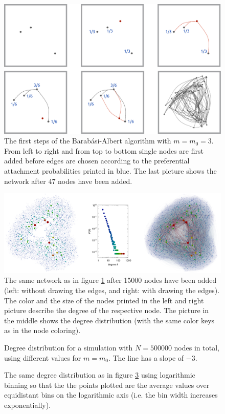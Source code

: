 \documentclass{scrartcl}
\begin{document}
\begin{figure}
    \includegraphics[width=\textwidth]{pictures/21_begin.pdf}
    \caption{The first steps of the Barab\'asi-Albert algorithm with $m
    = m_0 = 3$. From left to right and from top to bottom single nodes are
    first added before edges are chosen according to the preferential
    attachment probabilities printed in blue. The last picture shows the network
    after 47 nodes have been added.}
    \label{fig:21_begin}
\end{figure}

\begin{figure}
    \includegraphics[width=\textwidth]{pictures/21_end.pdf}
    \caption{The same network as in figure \ref{fig:21_begin} after 15000
    nodes have been added (left: without drawing the edges, and right: with
    drawing the edges). The color and the size of the nodes printed in the left
    and right picture describe the degree of the respective node. The
    picture in the middle shows the degree distribution (with the same color
    keys as in the node coloring).}
    \label{fig:21_end}
\end{figure}

\begin{figure}
    \caption{Degree distribution for a simulation with $N=500000$ nodes
    in total, using different values for $m=m_0$. The line has a slope of
    $-3$.}
    \label{fig:22_plot}
\end{figure}
\begin{figure}
    \caption{The same degree distribution as in figure \ref{fig:22_plot}
    using logarithmic binning so that the the points plotted are the average
    values over equidistant bins on the logarithmic axis (i.e. the bin width
    increases exponentially).}
    \label{fig:22_logplot}
\end{figure}
\end{document}
